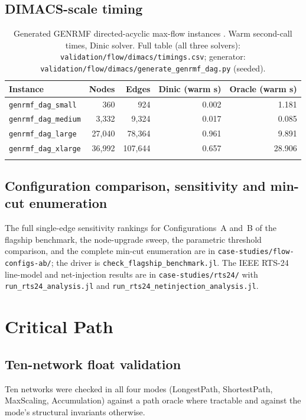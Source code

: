 \documentclass[12pt]{report}
\providecommand{\filepath}[1]{\nolinkurl{#1}}
\begin{document}
\subsection{DIMACS-scale timing}

{\footnotesize
\begin{longtable}{@{}l r r r r@{}}
\toprule
Instance & Nodes & Edges & Dinic (warm s) & Oracle (warm s) \\
\midrule
\endhead
\filepath{genrmf_dag_small}  & 360    & 924     & 0.002 & 1.181 \\
\filepath{genrmf_dag_medium} & 3{,}332  & 9{,}324   & 0.017 & 0.085 \\
\filepath{genrmf_dag_large}  & 27{,}040 & 78{,}364  & 0.961 & 9.891 \\
\filepath{genrmf_dag_xlarge} & 36{,}992 & 107{,}644 & 0.657 & 28.906 \\
\bottomrule
\caption{Generated GENRMF directed-acyclic max-flow instances \cite{johnson1993dimacs}.
Warm second-call times, Dinic solver. Full table (all three solvers):
\filepath{validation/flow/dimacs/timings.csv}; generator:
\filepath{validation/flow/dimacs/generate\_genrmf\_dag.py} (seeded).}
\label{tab:appB-dimacs}
\end{longtable}}

\subsection{Configuration comparison, sensitivity and min-cut enumeration}

The full single-edge sensitivity rankings for Configurations~A and~B of the flagship
benchmark, the node-upgrade sweep, the parametric threshold comparison, and the complete
min-cut enumeration are in \filepath{case-studies/flow-configs-ab/}; the driver is
\filepath{check_flagship_benchmark.jl}. The IEEE RTS-24 line-model and net-injection
results are in \filepath{case-studies/rts24/} with \filepath{run_rts24_analysis.jl} and
\filepath{run_rts24_netinjection_analysis.jl}.

\section{Critical Path}
\label{sec:appB-cpm}

\subsection{Ten-network float validation}

Ten networks were checked in all four modes (LongestPath, ShortestPath, MaxScaling,
Accumulation) against a path oracle where tractable and against the mode's structural
invariants otherwise.
\end{document}
